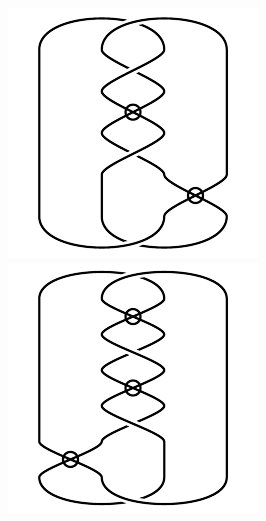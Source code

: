 \begin{figure}[H]
\begin{minipage}[b]{.18\linewidth}
\centering
\includegraphics[width=\linewidth]{../data/virtual_4_27.png}
\end{minipage}
\begin{minipage}[b]{.18\linewidth}
\centering
\includegraphics[width=\linewidth]{../data/virtual_4_28.png}

\end{minipage}
\end{figure}
